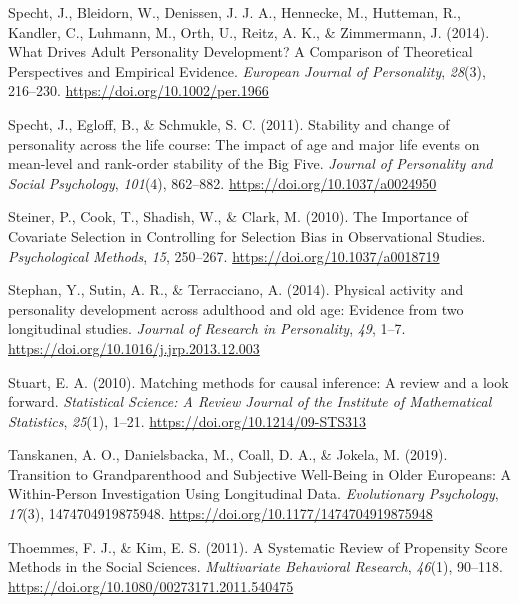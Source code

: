 \documentclass[
  english,
  man, noextraspace]{apa7}
\begin{document}
\leavevmode\hypertarget{ref-spechtWhatDrivesAdult2014}{}%
Specht, J., Bleidorn, W., Denissen, J. J. A., Hennecke, M., Hutteman, R., Kandler, C., Luhmann, M., Orth, U., Reitz, A. K., \& Zimmermann, J. (2014). What Drives Adult Personality Development? A Comparison of Theoretical Perspectives and Empirical Evidence. \emph{European Journal of Personality}, \emph{28}(3), 216--230. \url{https://doi.org/10.1002/per.1966}

\leavevmode\hypertarget{ref-spechtStabilityChangePersonality2011}{}%
Specht, J., Egloff, B., \& Schmukle, S. C. (2011). Stability and change of personality across the life course: The impact of age and major life events on mean-level and rank-order stability of the Big Five. \emph{Journal of Personality and Social Psychology}, \emph{101}(4), 862--882. \url{https://doi.org/10.1037/a0024950}

\leavevmode\hypertarget{ref-steinerImportanceCovariateSelection2010}{}%
Steiner, P., Cook, T., Shadish, W., \& Clark, M. (2010). The Importance of Covariate Selection in Controlling for Selection Bias in Observational Studies. \emph{Psychological Methods}, \emph{15}, 250--267. \url{https://doi.org/10.1037/a0018719}

\leavevmode\hypertarget{ref-stephanPhysicalActivityPersonality2014}{}%
Stephan, Y., Sutin, A. R., \& Terracciano, A. (2014). Physical activity and personality development across adulthood and old age: Evidence from two longitudinal studies. \emph{Journal of Research in Personality}, \emph{49}, 1--7. \url{https://doi.org/10.1016/j.jrp.2013.12.003}

\leavevmode\hypertarget{ref-stuartMatchingMethodsCausal2010}{}%
Stuart, E. A. (2010). Matching methods for causal inference: A review and a look forward. \emph{Statistical Science: A Review Journal of the Institute of Mathematical Statistics}, \emph{25}(1), 1--21. \url{https://doi.org/10.1214/09-STS313}

\leavevmode\hypertarget{ref-tanskanenTransitionGrandparenthoodSubjective2019}{}%
Tanskanen, A. O., Danielsbacka, M., Coall, D. A., \& Jokela, M. (2019). Transition to Grandparenthood and Subjective Well-Being in Older Europeans: A Within-Person Investigation Using Longitudinal Data. \emph{Evolutionary Psychology}, \emph{17}(3), 1474704919875948. \url{https://doi.org/10.1177/1474704919875948}

\leavevmode\hypertarget{ref-thoemmesSystematicReviewPropensity2011}{}%
Thoemmes, F. J., \& Kim, E. S. (2011). A Systematic Review of Propensity Score Methods in the Social Sciences. \emph{Multivariate Behavioral Research}, \emph{46}(1), 90--118. \url{https://doi.org/10.1080/00273171.2011.540475}
\end{document}

